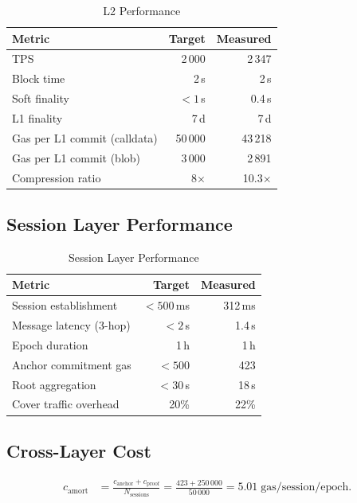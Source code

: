 \documentclass[11pt,a4paper]{article}
\begin{document}
\begin{table}[h]
\centering
\caption{L2 Performance}
\label{tab:l2-perf}
\begin{tabular}{@{}lrr@{}}
\toprule
\textbf{Metric} & \textbf{Target} & \textbf{Measured} \\
\midrule
TPS                           & 2\,000 & 2\,347 \\
Block time                    & 2\,s   & 2\,s   \\
Soft finality                 & $<1$\,s & 0.4\,s \\
L1 finality                   & 7\,d   & 7\,d   \\
Gas per L1 commit (calldata)  & 50\,000 & 43\,218 \\
Gas per L1 commit (blob)      & 3\,000  & 2\,891 \\
Compression ratio             & 8$\times$ & 10.3$\times$ \\
\bottomrule
\end{tabular}
\end{table}

\subsection{Session Layer Performance}

\begin{table}[h]
\centering
\caption{Session Layer Performance}
\label{tab:session-perf}
\begin{tabular}{@{}lrr@{}}
\toprule
\textbf{Metric} & \textbf{Target} & \textbf{Measured} \\
\midrule
Session establishment    & $<500$\,ms & 312\,ms \\
Message latency (3-hop)  & $<2$\,s    & 1.4\,s  \\
Epoch duration           & 1\,h       & 1\,h    \\
Anchor commitment gas    & $<500$     & 423     \\
Root aggregation         & $<30$\,s   & 18\,s   \\
Cover traffic overhead   & 20\%       & 22\%    \\
\bottomrule
\end{tabular}
\end{table}

\subsection{Cross-Layer Cost}

\begin{align}
    c_{\mathrm{amort}}
        &= \frac{c_{\mathrm{anchor}} + c_{\mathrm{proof}}}
               {N_{\mathrm{sessions}}}
        = \frac{423 + 250\,000}{50\,000}
        = 5.01\;\text{gas/session/epoch}.
\end{align}
\end{document}
